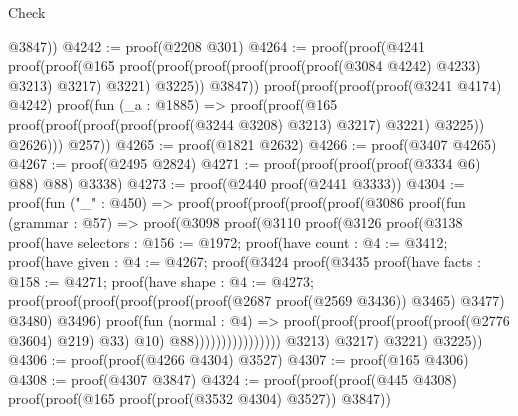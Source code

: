 \begin{lexlean}{Check}
\begin{coremodule}
          @3847))
@4242 := proof(@2208 @301)
@4264 := proof(proof(@4241
        proof(proof(@165
              proof(proof(proof(proof(proof(proof(@3084 @4242) @4233) @3213) @3217) @3221) @3225))
            @3847))
      proof(proof(proof(proof(@3241 @4174) @4242)
            proof(fun (_a : @1885) =>
              proof(proof(@165
                    proof(proof(proof(proof(proof(@3244 @3208) @3213) @3217) @3221) @3225))
                  @2626)))
          @257))
@4265 := proof(@1821 @2632)
@4266 := proof(@3407 @4265)
@4267 := proof(@2495 @2824)
@4271 := proof(proof(proof(proof(@3334 @6) @88) @88) @3338)
@4273 := proof(@2440 proof(@2441 @3333))
@4304 := proof(fun ("_" : @450) =>
    proof(proof(proof(proof(proof(@3086
                proof(fun (grammar : @57) =>
                  proof(@3098
                      proof(@3110
                          proof(@3126
                              proof(@3138
                                  proof(have selectors : @156 := @1972;
                                    proof(have count : @4 := @3412;
                                      proof(have given : @4 := @4267;
                                        proof(@3424
                                            proof(@3435
                                                proof(have facts : @158 := @4271;
                                                  proof(have shape : @4 := @4273;
                                                    proof(proof(proof(proof(proof(proof(@2687
                                                                  proof(@2569 @3436))
                                                                @3465)
                                                              @3477)
                                                            @3480)
                                                          @3496)
                                                        proof(fun (normal : @4) =>
                                                          proof(proof(proof(proof(proof(@2776 @3604)
                                                                    @219)
                                                                  @33)
                                                                @10)
                                                              @88))))))))))))))))
              @3213)
            @3217)
          @3221)
        @3225))
@4306 := proof(proof(@4266 @4304) @3527)
@4307 := proof(@165 @4306)
@4308 := proof(@4307 @3847)
@4324 := proof(proof(proof(@445 @4308) proof(proof(@165 proof(proof(@3532 @4304) @3527)) @3847))

\end{coremodule}
\end{lexlean}
